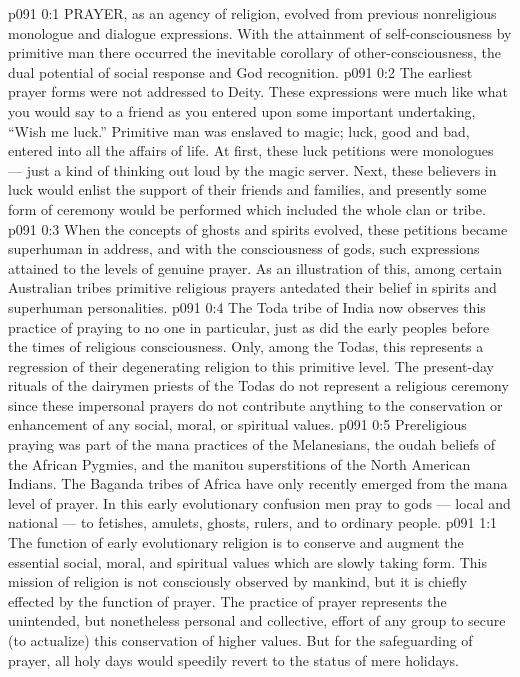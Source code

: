 \vs p091 0:1 PRAYER, as an agency of religion, evolved from previous nonreligious monologue and dialogue expressions. With the attainment of self\hyp{}consciousness by primitive man there occurred the inevitable corollary of other\hyp{}consciousness, the dual potential of social response and God recognition.
\vs p091 0:2 The earliest prayer forms were not addressed to Deity. These expressions were much like what you would say to a friend as you entered upon some important undertaking, “Wish me luck.” Primitive man was enslaved to magic; luck, good and bad, entered into all the affairs of life. At first, these luck petitions were monologues --- just a kind of thinking out loud by the magic server. Next, these believers in luck would enlist the support of their friends and families, and presently some form of ceremony would be performed which included the whole clan or tribe.
\vs p091 0:3 When the concepts of ghosts and spirits evolved, these petitions became superhuman in address, and with the consciousness of gods, such expressions attained to the levels of genuine prayer. As an illustration of this, among certain Australian tribes primitive religious prayers antedated their belief in spirits and superhuman personalities.
\vs p091 0:4 The Toda tribe of India now observes this practice of praying to no one in particular, just as did the early peoples before the times of religious consciousness. Only, among the Todas, this represents a regression of their degenerating religion to this primitive level. The present\hyp{}day rituals of the dairymen priests of the Todas do not represent a religious ceremony since these impersonal prayers do not contribute anything to the conservation or enhancement of any social, moral, or spiritual values.
\vs p091 0:5 Prereligious praying was part of the mana practices of the Melanesians, the oudah beliefs of the African Pygmies, and the manitou superstitions of the North American Indians. The Baganda tribes of Africa have only recently emerged from the mana level of prayer. In this early evolutionary confusion men pray to gods --- local and national --- to fetishes, amulets, ghosts, rulers, and to ordinary people.
\vs p091 1:1 The function of early evolutionary religion is to conserve and augment the essential social, moral, and spiritual values which are slowly taking form. This mission of religion is not consciously observed by mankind, but it is chiefly effected by the function of prayer. The practice of prayer represents the unintended, but nonetheless personal and collective, effort of any group to secure (to actualize) this conservation of higher values. But for the safeguarding of prayer, all holy days would speedily revert to the status of mere holidays.
